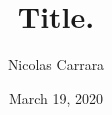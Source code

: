 \documentclass{beamer}
\author[shortname]{
    Nicolas Carrara  }
\institute[shortinst]{University of Toronto}
\title[]{Title.}
\date{March 19, 2020}
\begin{document}
    \begin{frame}
        \maketitle
        \centering
    \end{frame}
\end{document}
